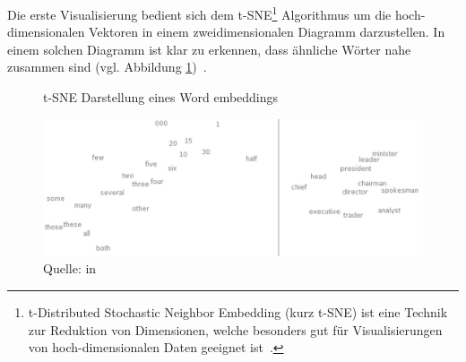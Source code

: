 Die erste Visualisierung bedient sich dem t-SNE\footnote{t-Distributed Stochastic Neighbor Embedding (kurz t-SNE) ist eine Technik zur Reduktion von Dimensionen, welche besonders gut für Visualisierungen von hoch-dimensionalen Daten geeignet ist~\autocite{tSNE}.} Algorithmus um die hoch-dimensionalen Vektoren in einem zweidimensionalen Diagramm darzustellen. In einem solchen Diagramm ist klar zu erkennen, dass ähnliche Wörter nahe zusammen sind (vgl. Abbildung \ref{wordembeddingtsne})~\autocite{Olah2014b}.
\begin{figure}[h!]
    \centering
    \captionsetup{width=.9\linewidth}
    \caption{t-SNE Darstellung eines Word embeddings}
    \includegraphics[width=\textwidth]{graphics/wordmebeddingtsne.jpg}
    \caption*{Quelle: \textcite{Turian2010} in \textcite{Olah2014b}}
    \vspace*{0.3cm}
    \label{wordembeddingtsne}
\end{figure}

